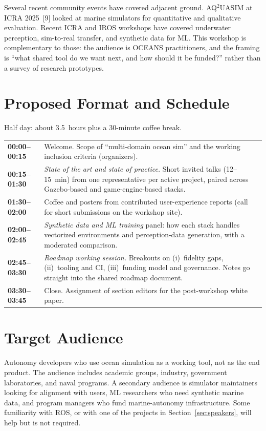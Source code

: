 \documentclass[10pt]{article}
\begin{document}
Several recent community events have covered adjacent ground. AQ$^2$UASIM at ICRA 2025~[9] looked at marine simulators for quantitative and qualitative evaluation. Recent ICRA and IROS workshops have covered underwater perception, sim-to-real transfer, and synthetic data for ML. This workshop is complementary to those: the audience is OCEANS practitioners, and the framing is ``what shared tool do we want next, and how should it be funded?'' rather than a survey of research prototypes.

\section{Proposed Format and Schedule}

Half day: about 3.5~hours plus a 30-minute coffee break.

\begin{tabular}{@{}p{}p{}@{}}
  \textbf{00:00--00:15} & Welcome. Scope of ``multi-domain ocean sim'' and the working inclusion criteria (organizers). \\
  \textbf{00:15--01:30} & \emph{State of the art and state of practice.} Short invited talks (12--15~min) from one representative per active project, paired across Gazebo-based and game-engine-based stacks. \\
  \textbf{01:30--02:00} & Coffee and posters from contributed user-experience reports (call for short submissions on the workshop site). \\
  \textbf{02:00--02:45} & \emph{Synthetic data and ML training} panel: how each stack handles vectorized environments and perception-data generation, with a moderated comparison. \\
  \textbf{02:45--03:30} & \emph{Roadmap working session.} Breakouts on (i)~fidelity gaps, (ii)~tooling and CI, (iii)~funding model and governance. Notes go straight into the shared roadmap document. \\
  \textbf{03:30--03:45} & Close. Assignment of section editors for the post-workshop white paper. \\
\end{tabular}

\section{Target Audience}

Autonomy developers who use ocean simulation as a working tool, not as the end product. The audience includes academic groups, industry, government laboratories, and naval programs. A secondary audience is simulator maintainers looking for alignment with users, ML researchers who need synthetic marine data, and program managers who fund marine-autonomy infrastructure. Some familiarity with ROS, or with one of the projects in Section~\ref{sec:speakers}, will help but is not required.
\end{document}
